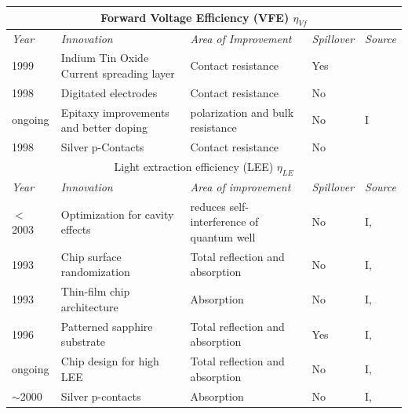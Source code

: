 \documentclass[10pt]{article}
\begin{document}
\begin{table}[H]
    \begin{tabularx}{\textwidth}{ |l|X|X|l|l| }
        \multicolumn{5}{c}{Forward Voltage Efficiency (VFE) $\eta_{Vf}$} \\
        \hline
            \textit{Year} & \textit{Innovation} & \textit{Area of Improvement} & \textit{Spillover} & \textit{Source} \\
        \hline
            1999 & Indium Tin Oxide \newline Current spreading layer & Contact resistance & Yes & \cite{margalith1999indium}\\
        \hline
            1998 & Digitated electrodes & Contact resistance & No & \cite{steigerwald2001electrode} \\
        \hline
            ongoing & Epitaxy improvements \newline and better doping & polarization and \newline bulk resistance & No & I \\
        \hline
            1998 & Silver p-Contacts & Contact resistance & No & \cite{kondoh2001nitride} \\
        \hline
        \multicolumn{5}{c}{Light extraction efficiency (LEE) $\eta_{LE}$} \\
        \hline
            \textit{Year} & \textit{Innovation} & \textit{Area of improvement} & \textit{Spillover} & \textit{Source} \\
        \hline
            $<$ 2003 & Optimization for \newline cavity effects & reduces self-interference of quantum well & No & I, \cite{Shen2003} \\
        \hline
            1993 & Chip surface randomization & Total reflection and absorption & No & I, \cite{bergh1973surface}\cite{Schnitzer1993} \\
        \hline
            1993 & Thin-film chip architecture & Absorption & No & I, \cite{Schnitzer1993} \\
        \hline
            1996 & Patterned sapphire substrate  & Total reflection and absorption & Yes & I, \cite{Tadatomo2001} \\
        \hline
            ongoing & Chip design for high LEE & Total reflection and absorption & No & I, \cite{Haerle2004} \\
        \hline
            $\sim$2000 & Silver p-contacts & Absorption & No & I, \cite{kondoh2001nitride} \\
        \hline

\end{tabularx}
\end{table}
\end{document}
